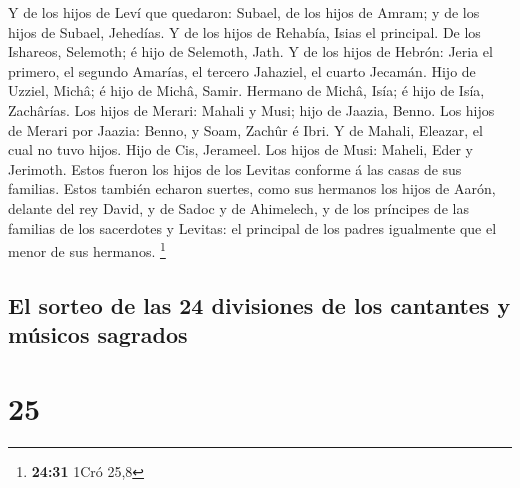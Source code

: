  Y de los hijos de Leví que quedaron: Subael, de los hijos
de Amram; y de los hijos de Subael, Jehedías.  Y de los
hijos de Rehabía, Isias el principal.  De los Ishareos,
Selemoth; é hijo de Selemoth, Jath.  Y de los hijos de
Hebrón: Jeria el primero, el segundo Amarías, el tercero Jahaziel, el
cuarto Jecamán.  Hijo de Uzziel, Michâ; é hijo de Michâ,
Samir.  Hermano de Michâ, Isía; é hijo de Isía, Zachârías.
 Los hijos de Merari: Mahali y Musi; hijo de Jaazia, Benno.
 Los hijos de Merari por Jaazia: Benno, y Soam, Zachûr é
Ibri.  Y de Mahali, Eleazar, el cual no tuvo hijos.
 Hijo de Cis, Jerameel.  Los hijos de Musi:
Maheli, Eder y Jerimoth. Estos fueron los hijos de los Levitas conforme
á las casas de sus familias.  Estos también echaron
suertes, como sus hermanos los hijos de Aarón, delante del rey David, y
de Sadoc y de Ahimelech, y de los príncipes de las familias de los
sacerdotes y Levitas: el principal de los padres igualmente que el menor
de sus hermanos. \footnote{\textbf{24:31} 1Cró 25,8}

\hypertarget{el-sorteo-de-las-24-divisiones-de-los-cantantes-y-muxfasicos-sagrados}{%
\subsection{El sorteo de las 24 divisiones de los cantantes y músicos
sagrados}\label{el-sorteo-de-las-24-divisiones-de-los-cantantes-y-muxfasicos-sagrados}}

\hypertarget{section-24}{%
\section{25}\label{section-24}}

